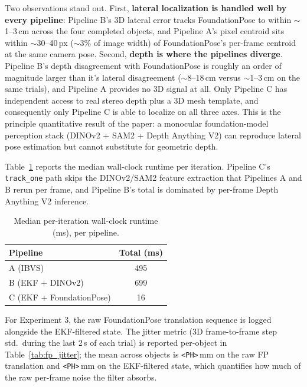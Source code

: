 \documentclass[letterpaper, 10 pt, conference]{ieeeconf}  %
\begin{document}
Two observations stand out. First, \textbf{lateral localization is handled well by every pipeline}: Pipeline B's 3D lateral error tracks FoundationPose to within $\sim$1--3\,cm across the four completed objects, and Pipeline A's pixel centroid sits within $\sim$30--40\,px ($\sim$3\% of image width) of FoundationPose's per-frame centroid at the same camera pose. Second, \textbf{depth is where the pipelines diverge}. Pipeline B's depth disagreement with FoundationPose is roughly an order of magnitude larger than it's lateral disagreement ($\sim$8--18\,cm versus $\sim$1--3\,cm on the same trials), and Pipeline A provides no 3D signal at all. Only Pipeline C has independent access to real stereo depth plus a 3D mesh template, and consequently only Pipeline C is able to localize on all three axes. This is the principle quantitative result of the paper: a monocular foundation-model perception stack (DINOv2 + SAM2 + Depth Anything V2) can reproduce lateral pose estimation but cannot substitute for geometric depth.

Table~\ref{tab:exp1_runtime} reports the median wall-clock runtime per iteration. Pipeline C's \texttt{track\_one} path skips the DINOv2/SAM2 feature extraction that Pipelines A and B rerun per frame, and Pipeline B's total is dominated by per-frame Depth Anything V2 inference.

\begin{table}[h]
\centering
\caption{Median per-iteration wall-clock runtime (ms), per pipeline.}
\label{tab:exp1_runtime}
\footnotesize
\begin{tabular}{@{}lc@{}}
\toprule
Pipeline & Total (ms) \\
\midrule
A (IBVS)                 & 495 \\
B (EKF + DINOv2)         & 699 \\
C (EKF + FoundationPose) & 16  \\
\bottomrule
\end{tabular}
\end{table}

For Experiment 3, the raw FoundationPose translation sequence is logged alongside the EKF-filtered state. The jitter metric (3D frame-to-frame step std.\ during the last 2\,s of each trial) is reported per-object in Table~\ref{tab:fp_jitter}; the mean across objects is \texttt{<PH>}\,mm on the raw FP translation and \texttt{<PH>}\,mm on the EKF-filtered state, which quantifies how much of the raw per-frame noise the filter absorbs.
\end{document}
